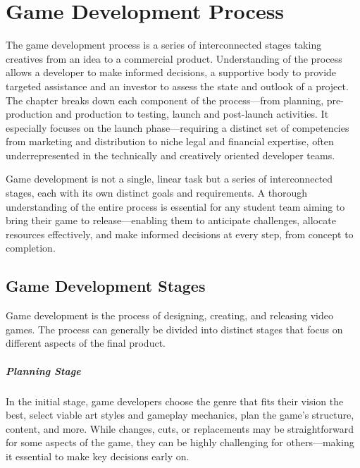 \chapter{Game Development Process}\label{chap:game-dev}

\begin{chapterabstract}
	The game development process is a series of interconnected stages taking creatives from an idea to a commercial product. Understanding of the process allows a developer to make informed decisions, a supportive body to provide targeted assistance and an investor to assess the state and outlook of a project. The chapter breaks down each component of the process---from planning, pre-production and production to testing, launch and post-launch activities. It especially focuses on the launch phase---requiring a distinct set of competencies from marketing and distribution to niche legal and financial expertise, often underrepresented in the technically and creatively oriented developer teams.
\end{chapterabstract}

Game development is not a single, linear task but a series of interconnected stages, each with its own distinct goals and requirements. A thorough understanding of the entire process is essential for any student team aiming to bring their game to release---enabling them to anticipate challenges, allocate resources effectively, and make informed decisions at every step, from concept to completion.

\section{Game Development Stages}
Game development is the process of designing, creating, and releasing video games. The process can generally be divided into distinct stages that focus on different aspects of the final product.
\cite{bramble_7-stages, rocket_6-stages}

\paragraph{Planning Stage}
In the initial stage, game developers choose the genre that fits their vision the best, select viable art styles and gameplay mechanics, plan the game’s structure, content, and more. While changes, cuts, or replacements may be straightforward for some aspects of the game, they can be highly challenging for others—making it essential to make key decisions early on.
\cite{bramble_7-stages, rocket_6-stages}

